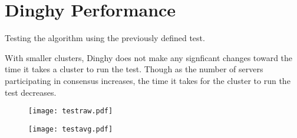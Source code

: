 \section{Dinghy Performance}

Testing the algorithm using the previously defined test.


With smaller clusters, Dinghy does not make any signficant changes toward the time it takes a cluster to run the test.
Though as the number of servers participating in consensus increases, the time it takes for the cluster to run the test decreases.


\begin{figure}[!h]
\centering
\texttt{[image: testraw.pdf]}
\end{figure}


\begin{figure}[!h]
\centering
\texttt{[image: testavg.pdf]}
\end{figure}